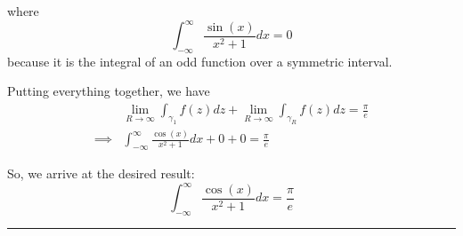 \documentclass{article}
\begin{document}
where 
\[ \int_{-\infty}^{\infty} \frac{\sin(x)}{x^2 + 1} dx = 0 \]
because it is the integral of an odd function over a symmetric interval.

\vskip 0.5cm
Putting everything together, we have 
\begin{align*}
  &\lim_{R \rightarrow \infty} \int_{{\gamma}_{1}} f(z) dz + \lim_{R \rightarrow \infty}  \int_{{\gamma}_{R}} f(z) dz  = \frac{\pi}{e} \\
  \implies &\int_{-\infty}^{\infty} \frac{\cos(x)}{x^2 + 1} dx + 0 + 0 = \frac{\pi}{e}
\end{align*}

So, we arrive at the desired result:
\[ \boxed{ \int_{-\infty}^{\infty} \frac{\cos(x)}{x^2 + 1} dx = \frac{\pi}{e} } \]

\vskip 0.5cm
\hrule 
\vskip 0.5cm






\end{document}
